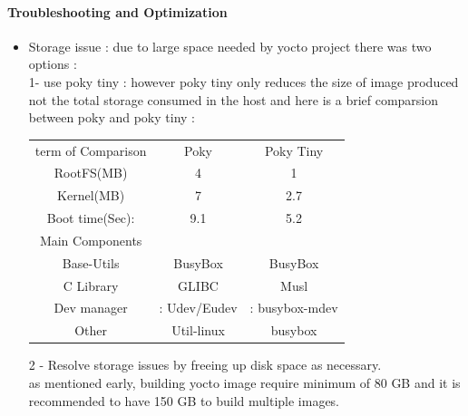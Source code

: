 \paragraph{Troubleshooting and Optimization}
\begin{itemize}
    \item Storage issue : due to large space needed by yocto project there was two options :\\
    1- use poky tiny : however poky tiny only reduces the size of image produced not the total storage consumed in the host and here is a brief comparsion between poky and poky tiny : \\
    \noindent
\centering
        \begin{tabular}{|| c c c ||}\hline
         term of Comparison  & Poky & Poky Tiny \\ 
         RootFS(MB) & 4 & 1 \\  
         Kernel(MB) & 7 & 2.7  \\  
         Boot time(Sec):  & 9.1 & 5.2 \\  
         Main Components & &  \\  
         Base-Utils & BusyBox & BusyBox \\  
         C Library & GLIBC & Musl \\  
         Dev manager & : Udev/Eudev & : busybox-mdev  \\
         Other & Util-linux  & busybox  \\
         \hline
        \end{tabular} 

\raggedright

    
   2 - Resolve storage issues by freeing up disk space as necessary.\\
   as mentioned early, building yocto image require minimum of 80 GB and it is recommended to have 150 GB to build multiple images.
   

\end{itemize}
